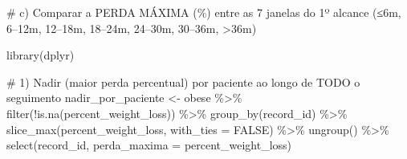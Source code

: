 \documentclass[
]{article}
\newenvironment{Shaded}{\begin{snugshade}}{\end{snugshade}}
\newcommand{\AlertTok}[1]{\textcolor[rgb]{0.68,0.00,0.00}{#1}}
\newcommand{\AttributeTok}[1]{\textcolor[rgb]{0.40,0.45,0.13}{#1}}
\newcommand{\CommentTok}[1]{\textcolor[rgb]{0.37,0.37,0.37}{#1}}
\newcommand{\ConstantTok}[1]{\textcolor[rgb]{0.56,0.35,0.01}{#1}}
\newcommand{\FunctionTok}[1]{\textcolor[rgb]{0.28,0.35,0.67}{#1}}
\newcommand{\NormalTok}[1]{\textcolor[rgb]{0.00,0.23,0.31}{#1}}
\newcommand{\OtherTok}[1]{\textcolor[rgb]{0.00,0.23,0.31}{#1}}
\newcommand{\SpecialCharTok}[1]{\textcolor[rgb]{0.37,0.37,0.37}{#1}}
\begin{document}
\begin{Shaded}
\begin{Highlighting}[]
\CommentTok{\# c) Comparar a PERDA MÁXIMA (\%) entre as 7 janelas do 1º alcance (≤6m, 6–12m, 12–18m, 18–24m, 24–30m, 30–36m, \textgreater{}36m)}

\FunctionTok{library}\NormalTok{(dplyr)}

\CommentTok{\# 1) Nadir (maior perda percentual) por paciente ao longo de }\AlertTok{TODO}\CommentTok{ o seguimento}
\NormalTok{nadir\_por\_paciente }\OtherTok{\textless{}{-}}\NormalTok{ obese }\SpecialCharTok{\%\textgreater{}\%}
  \FunctionTok{filter}\NormalTok{(}\SpecialCharTok{!}\FunctionTok{is.na}\NormalTok{(percent\_weight\_loss)) }\SpecialCharTok{\%\textgreater{}\%}
  \FunctionTok{group\_by}\NormalTok{(record\_id) }\SpecialCharTok{\%\textgreater{}\%}
  \FunctionTok{slice\_max}\NormalTok{(percent\_weight\_loss, }\AttributeTok{with\_ties =} \ConstantTok{FALSE}\NormalTok{) }\SpecialCharTok{\%\textgreater{}\%}
  \FunctionTok{ungroup}\NormalTok{() }\SpecialCharTok{\%\textgreater{}\%}
  \FunctionTok{select}\NormalTok{(record\_id, }\AttributeTok{perda\_maxima =}\NormalTok{ percent\_weight\_loss)}


\end{Highlighting}
\end{Shaded}
\end{document}

